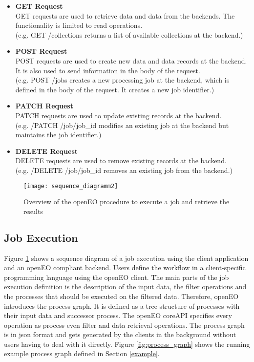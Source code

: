 \documentclass[draft,final]{vutinfth} %
\begin{document}
\begin{itemize}
	\item \textbf{GET Request} \\
	GET requests are used to retrieve data and data from the backends. The functionality is limited to read operations. \\(e.g. GET /collections returns a list of available collections at the backend.)
	\item \textbf{POST Request} \\ 
	POST requests are used to create new data and data records at the backend. It is also used to send information in the body of the request. \\(e.g. POST /jobs creates a new processing job at the backend, which is defined in the body of the request. It creates a new job identifier.)  
	\item \textbf{PATCH Request} \\
	PATCH requests are used to update existing records at the backend. \\(e.g. /PATCH /job/{job\_id} modifies an existing job at the backend but maintains the job identifier.)
	\item \textbf{DELETE Request} \\ 
	DELETE requests are used to remove existing records at the backend. \\(e.g. /DELETE /job/{job\_id} removes an existing job from the backend.)
\end{itemize}

\begin{figure}[h]
	\centering
	\texttt{[image: sequence\_diagramm2]}
	\caption{Overview of the openEO procedure to execute a job and retrieve the results}
	\label{fig:api2} %
\end{figure}


\subsection{Job Execution}\label{Job Execution}
Figure \ref{fig:api2} shows a sequence diagram of a job execution using the client application and an openEO compliant backend. Users define the workflow in a client-specific programming language using the openEO client. The main parts of the job execution definition is the description of the input data, the filter operations and the processes that should be executed on the filtered data. Therefore, openEO introduces the process graph. It is defined as a tree structure of processes with their input data and successor process. The openEO coreAPI specifies every operation as process even filter and data retrieval operations. The process graph is in \gls{json} format and gets generated by the clients in the background without users having to deal with it directly. Figure \ref{fig:process_graph} shows the running example process graph defined in Section \ref{example}.  
\end{document}
